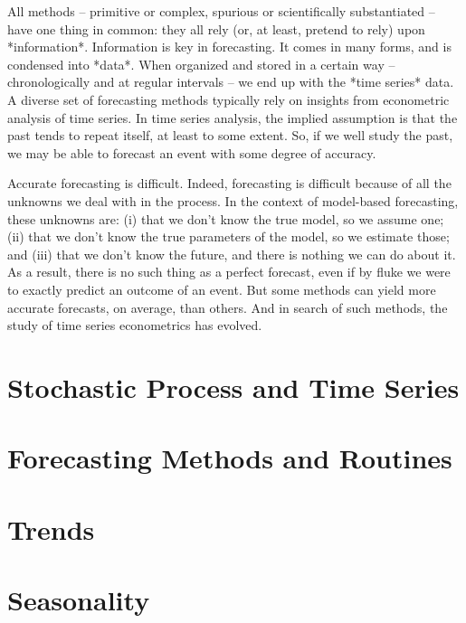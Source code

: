 \documentclass{tufte-book}
\begin{document}
	All methods -- primitive or complex, spurious or scientifically substantiated -- have one thing in common: they all rely (or, at least, pretend to rely) upon *information*. Information is key in forecasting. It comes in many forms, and is condensed into *data*. When organized and stored in a certain way -- chronologically and at regular intervals -- we end up with the *time series* data. A diverse set of forecasting methods typically rely on insights from econometric analysis of time series. In time series analysis, the implied assumption is that the past tends to repeat itself, at least to some extent. So, if we well study the past, we may be able to forecast an event with some degree of accuracy. 
	
	Accurate forecasting is difficult. Indeed, forecasting is difficult because of all the unknowns we deal with in the process. In the context of model-based forecasting, these unknowns are: (i) that we don't know the true model, so we assume one; (ii) that we don't know the true parameters of the model, so we estimate those; and (iii) that we don't know the future, and there is nothing we can do about it. As a result, there is no such thing as a perfect forecast, even if by fluke we were to exactly predict an outcome of an event. But some methods can yield more accurate forecasts, on average, than others. And in search of such methods, the study of time series econometrics has evolved. 
	
	\chapter{Stochastic Process and Time Series}
	\label{c2}

	
	\chapter{Forecasting Methods and Routines}
	\label{c3}
	
	
	\chapter{Trends}
	\label{c4}
	
	
	\chapter{Seasonality}
	\label{c5}
	
\end{document}
